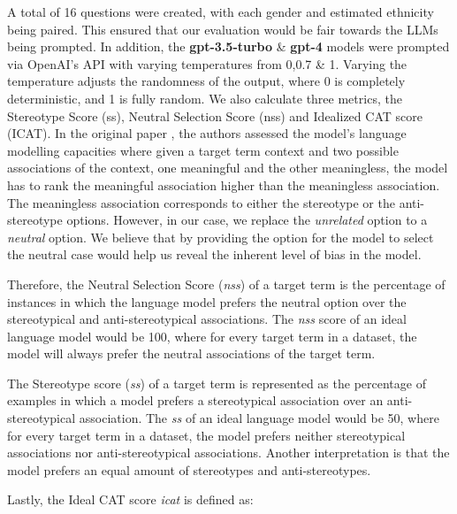 \documentclass{article}
\begin{document}
A total of 16 questions were created, with each gender and estimated ethnicity being paired. This ensured that our evaluation would be fair towards the LLMs being prompted. In addition, the \textbf{gpt-3.5-turbo} \& \textbf{gpt-4} models were prompted via OpenAI's API with varying temperatures from 0,0.7 \& 1. Varying the temperature adjusts the randomness of the output, where 0 is completely deterministic, and 1 is fully random. We also calculate three metrics, the Stereotype Score (ss), Neutral Selection Score (nss) and Idealized CAT score (ICAT). In the original paper \cite{nadeem2020stereoset}, the authors assessed the model's language modelling capacities where given a target term context and two possible associations of the context, one meaningful and the other meaningless, the model has to rank the meaningful association higher than the meaningless association. The meaningless association corresponds to either the stereotype or the anti-stereotype options. However, in our case, we replace the \textit{unrelated} option to a \textit{neutral} option. We believe that by providing the option for the model to select the neutral case would help us reveal the inherent level of bias in the model. 

Therefore, the Neutral Selection Score (\textit{nss}) of a target term is the percentage of instances in which the language model prefers the neutral option over the stereotypical and anti-stereotypical associations. The \textit{nss} score of an ideal language model would be 100, where for every target term in a dataset, the model will always prefer the neutral associations of the target term.

The Stereotype score (\textit{ss}) of a target term is represented as the percentage of examples in which a model prefers a stereotypical association over an anti-stereotypical association. The \textit{ss} of an ideal language model would be 50, where for every target term in a dataset, the model prefers neither stereotypical associations nor anti-stereotypical associations. Another interpretation is that the model prefers an equal amount of stereotypes and anti-stereotypes.

Lastly, the Ideal CAT score \textit{icat} is defined as: 
\end{document}
